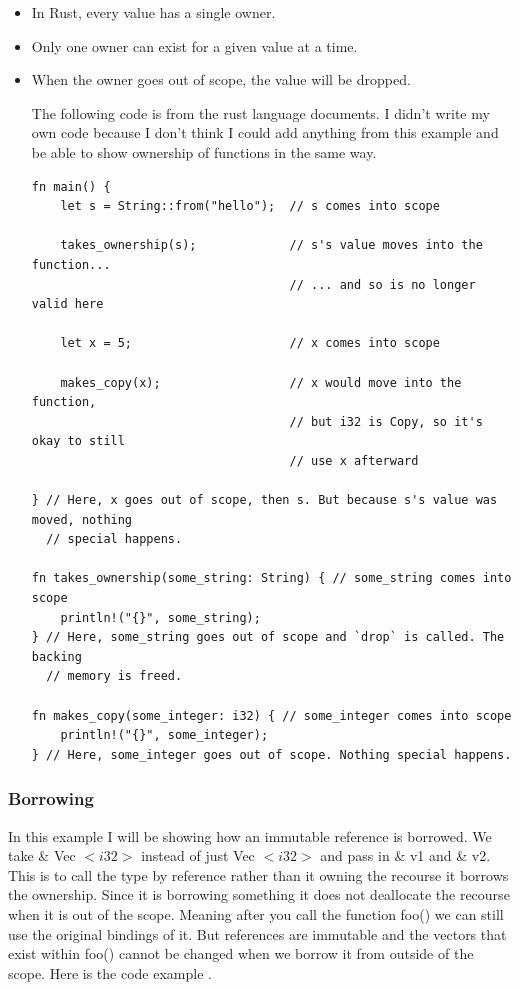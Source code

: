 \documentclass{article}
\theoremstyle{theorem}
\theoremstyle{definition}
\theoremstyle{remark}
\begin{document}
\begin{itemize}
\item In Rust, every value has a single owner.
\item Only one owner can exist for a given value at a time.
\item When the owner goes out of scope, the value will be dropped.

The following code is from the rust language documents. I didn't write my own code because I don't think I could add anything from this example and be able to show ownership of functions in the same way.\cite{WIO}

\begin{lstlisting}
fn main() {
    let s = String::from("hello");  // s comes into scope

    takes_ownership(s);             // s's value moves into the function...
                                    // ... and so is no longer valid here

    let x = 5;                      // x comes into scope

    makes_copy(x);                  // x would move into the function,
                                    // but i32 is Copy, so it's okay to still
                                    // use x afterward

} // Here, x goes out of scope, then s. But because s's value was moved, nothing
  // special happens.

fn takes_ownership(some_string: String) { // some_string comes into scope
    println!("{}", some_string);
} // Here, some_string goes out of scope and `drop` is called. The backing
  // memory is freed.

fn makes_copy(some_integer: i32) { // some_integer comes into scope
    println!("{}", some_integer);
} // Here, some_integer goes out of scope. Nothing special happens.
\end{lstlisting}
\end{itemize}

\subsubsection{Borrowing}
 In this example I will be showing how an immutable reference is borrowed. We take \& Vec $< i32 >$ instead of just Vec $< i32 >$ and pass in \& v1 and \& v2. This is to call the type by reference rather than it owning the recourse it borrows the ownership. Since it is borrowing something it does not deallocate the recourse when it is out of the scope. Meaning after you call the function foo() we can still use the original bindings of it. But references are immutable and the vectors that exist within foo() cannot be changed when we borrow it from outside of the scope. Here is the code example \cite{RAB}. 
\end{document}
